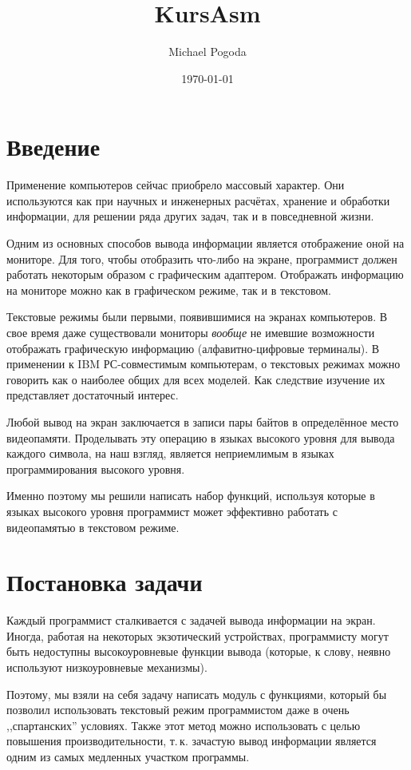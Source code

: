 \documentclass[a4paper,12pt,notitlepage,pdftex,headsepline]{scrartcl}
\author{Michael Pogoda}
\title{KursAsm}
\date{\today}
\begin{document}

\newpage
{}
\tableofcontents
\newpage
{}
\large
\section*{Введение}
Применение компьютеров сейчас приобрело массовый характер.
Они используются как при научных и инженерных расчётах, хранение и обработки информации, для решении ряда других задач, так и в повседневной жизни.

Одним из основных способов вывода информации является отображение оной на мониторе.
Для того, чтобы отобразить что-либо на экране, программист должен работать некоторым образом с графическим адаптером.
Отображать информацию на мониторе можно как в графическом режиме, так и в текстовом.

Текстовые режимы были первыми, появившимися на экранах компьютеров.
В свое время даже существовали мониторы \textit{вообще} не имевшие возможности отображать графическую информацию (алфавитно-цифровые терминалы).
В применении к IBM РС-совместимым компьютерам, о текстовых режимах можно говорить как о наиболее общих для всех моделей.
Как следствие изучение их представляет достаточный интерес.

Любой вывод на экран заключается в записи пары байтов в определённое место видеопамяти.
Проделывать эту операцию в языках высокого уровня для вывода каждого символа, на наш взгляд, является неприемлимым в языках программирования высокого уровня.

Именно поэтому мы решили написать набор функций, используя которые в языках высокого уровня программист может эффективно работать с видеопамятью в текстовом режиме.
\newpage
\section{Постановка задачи}
Каждый программист сталкивается с задачей вывода информации на экран.
Иногда, работая на некоторых экзотический устройствах, программисту могут быть недоступны высокоуровневые функции вывода (которые, к слову, неявно используют низкоуровневые механизмы).

Поэтому, мы взяли на себя задачу написать модуль с функциями, который бы позволил использовать текстовый режим программистом даже в очень ,,спартанских'' условиях.
Также этот метод можно использовать с целью повышения производительности, т.\,к. зачастую вывод информации является одним из самых медленных участком программы.
\end{document}
